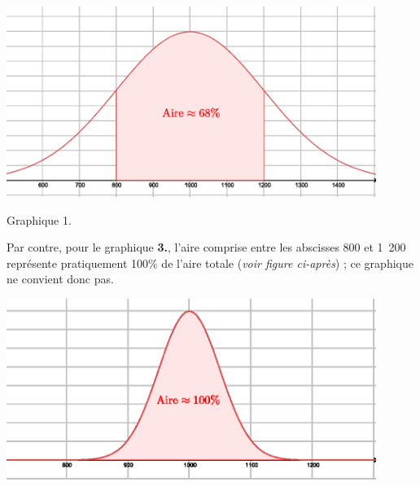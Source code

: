 \begin{corrige}
\begin{enumerate}
\begin{center}
\end{center}
          \begin{center}
               \begin{extern}%
                    \includegraphics[width=0.9\textwidth]{images/BBESL-s5-1-5}%
               \end{extern}
          \end{center}
          \begin{center}
               Graphique 1.
          \end{center}
          \par
          Par contre, pour le graphique \textbf{3.}, l'aire comprise entre les abscisses 800 et 1\ 200 représente pratiquement 100\% de l'aire totale (\textit{voir figure ci-après}) ; ce graphique ne convient donc pas.
          \begin{center}
               \begin{extern}%
                    \includegraphics[width=0.9\textwidth]{images/BBESL-s5-1-6}%
               \end{extern}

\end{center}
\end{enumerate}
\end{corrige}

